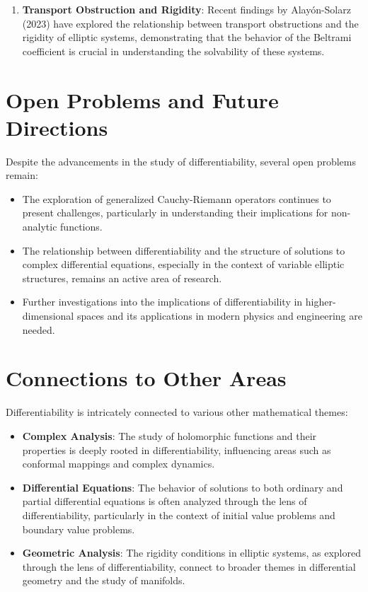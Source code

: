 \documentclass[11pt,a4paper]{article}
\begin{document}
\begin{enumerate}
\item \textbf{Transport Obstruction and Rigidity}: Recent findings by Alayón-Solarz (2023) have explored the relationship between transport obstructions and the rigidity of elliptic systems, demonstrating that the behavior of the Beltrami coefficient is crucial in understanding the solvability of these systems.
\end{enumerate}

\section{Open Problems and Future Directions}

Despite the advancements in the study of differentiability, several open problems remain:
\begin{itemize}
\item The exploration of generalized Cauchy-Riemann operators continues to present challenges, particularly in understanding their implications for non-analytic functions.
\item The relationship between differentiability and the structure of solutions to complex differential equations, especially in the context of variable elliptic structures, remains an active area of research.
\item Further investigations into the implications of differentiability in higher-dimensional spaces and its applications in modern physics and engineering are needed.
\end{itemize}

\section{Connections to Other Areas}

Differentiability is intricately connected to various other mathematical themes:
\begin{itemize}
\item \textbf{Complex Analysis}: The study of holomorphic functions and their properties is deeply rooted in differentiability, influencing areas such as conformal mappings and complex dynamics.
\item \textbf{Differential Equations}: The behavior of solutions to both ordinary and partial differential equations is often analyzed through the lens of differentiability, particularly in the context of initial value problems and boundary value problems.
\item \textbf{Geometric Analysis}: The rigidity conditions in elliptic systems, as explored through the lens of differentiability, connect to broader themes in differential geometry and the study of manifolds.
\end{itemize}
\end{document}
